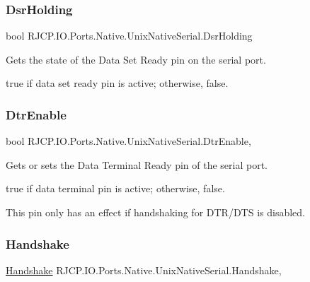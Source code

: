 \subsubsection{\texorpdfstring{DsrHolding}{DsrHolding}}
{\footnotesize\ttfamily bool R\+J\+C\+P.\+I\+O.\+Ports.\+Native.\+Unix\+Native\+Serial.\+Dsr\+Holding\hspace{0.3cm}{\ttfamily [get]}}



Gets the state of the Data Set Ready pin on the serial port. 

{\ttfamily true} if data set ready pin is active; otherwise, {\ttfamily false}. \mbox{\label{class_r_j_c_p_1_1_i_o_1_1_ports_1_1_native_1_1_unix_native_serial_aee4bb1ce2aa98414dc4c52ef849943e3}} 
\subsubsection{\texorpdfstring{DtrEnable}{DtrEnable}}
{\footnotesize\ttfamily bool R\+J\+C\+P.\+I\+O.\+Ports.\+Native.\+Unix\+Native\+Serial.\+Dtr\+Enable\hspace{0.3cm}{\ttfamily [get]}, {\ttfamily [set]}}



Gets or sets the Data Terminal Ready pin of the serial port. 

{\ttfamily true} if data terminal pin is active; otherwise, {\ttfamily false}. 

This pin only has an effect if handshaking for D\+T\+R/\+D\+TS is disabled. \mbox{\label{class_r_j_c_p_1_1_i_o_1_1_ports_1_1_native_1_1_unix_native_serial_a27e292f45b69d1a8ca363c625d6baed5}} 
\subsubsection{\texorpdfstring{Handshake}{Handshake}}
{\footnotesize\ttfamily \mbox{\hyperlink{namespace_r_j_c_p_1_1_i_o_1_1_ports_a5328e888558ed5726b3fb7b8b692527c}{Handshake}} R\+J\+C\+P.\+I\+O.\+Ports.\+Native.\+Unix\+Native\+Serial.\+Handshake\hspace{0.3cm}{\ttfamily [get]}, {\ttfamily [set]}}



